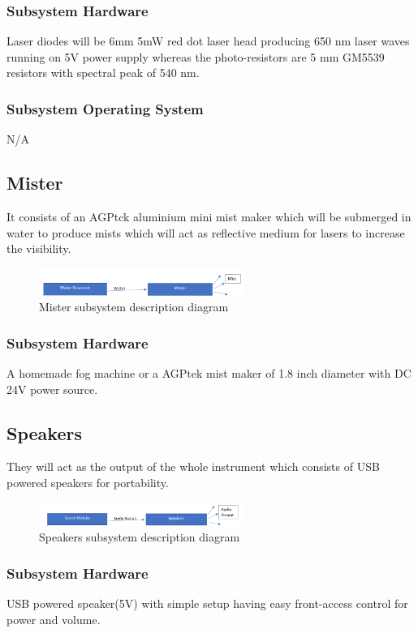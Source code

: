 \subsubsection{Subsystem Hardware}
Laser diodes will be 6mm 5mW red dot laser head producing 650 nm laser waves running on 5V power supply whereas the photo-resistors are 5 mm GM5539 resistors with spectral peak of 540 nm.

\subsubsection{Subsystem Operating System}
N/A

\subsection{Mister}
It consists of an AGPtck aluminium mini mist maker which will be submerged in water to produce mists which will act as reflective medium for lasers to increase the visibility.

\begin{figure}[h!]
	\centering
 	\includegraphics[width=0.60\textwidth]{images/Mister.png}
 \caption{Mister subsystem description diagram}
\end{figure}

\subsubsection{Subsystem Hardware}
A homemade fog machine or a AGPtek mist maker of 1.8 inch diameter with DC 24V power source.

\subsection{Speakers}
They will act as the output of the whole instrument which consists of USB powered speakers for portability.

\begin{figure}[h!]
	\centering
 	\includegraphics[width=0.60\textwidth]{images/Speaker.png}
 \caption{Speakers subsystem description diagram}
\end{figure}

\subsubsection{Subsystem Hardware}
USB powered speaker(5V) with simple setup having easy front-access control for power and volume.









